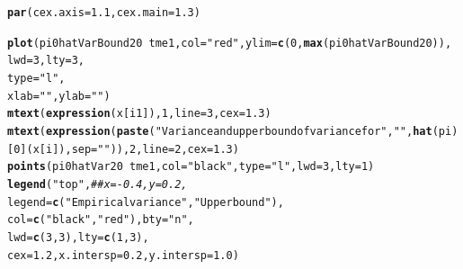 \documentclass{article}\usepackage[]{graphicx}\usepackage[]{color}
\makeatletter
\newcommand{\hlnum}[1]{\textcolor[rgb]{0.686,0.059,0.569}{#1}}%
\newcommand{\hlstr}[1]{\textcolor[rgb]{0.192,0.494,0.8}{#1}}%
\newcommand{\hlcom}[1]{\textcolor[rgb]{0.678,0.584,0.686}{\textit{#1}}}%
\newcommand{\hlopt}[1]{\textcolor[rgb]{0,0,0}{#1}}%
\newcommand{\hlstd}[1]{\textcolor[rgb]{0.345,0.345,0.345}{#1}}%
\newcommand{\hlkwc}[1]{\textcolor[rgb]{0.333,0.667,0.333}{#1}}%
\newcommand{\hlkwd}[1]{\textcolor[rgb]{0.737,0.353,0.396}{\textbf{#1}}}%
\newenvironment{kframe}{%
 \def\at@end@of@kframe{}%
 \ifinner\ifhmode%
  \def\at@end@of@kframe{\end{minipage}}%
  \begin{minipage}{\columnwidth}%
 \fi\fi%
 \def\FrameCommand##1{\hskip\@totalleftmargin \hskip-\fboxsep
 \colorbox{shadecolor}{##1}\hskip-\fboxsep
     \hskip-\linewidth \hskip-\@totalleftmargin \hskip\columnwidth}%
 \MakeFramed {\advance\hsize-\width
   \@totalleftmargin\z@ \linewidth\hsize
   \@setminipage}}%
 {\par\unskip\endMakeFramed%
 \at@end@of@kframe}
\newenvironment{knitrout}{}{} %
\makeatother
\begin{document}
\begin{knitrout}
\color{fgcolor}\begin{kframe}
\begin{alltt}
\hlkwd{par}\hlstd{(}\hlkwc{cex.axis} \hlstd{=} \hlnum{1.1}\hlstd{,} \hlkwc{cex.main}\hlstd{=}\hlnum{1.3}\hlstd{)}

\hlkwd{plot}\hlstd{(pi0hatVarBound20} \hlopt{~} \hlstd{tme1,} \hlkwc{col}\hlstd{=}\hlstr{"red"}\hlstd{,} \hlkwc{ylim}\hlstd{=}\hlkwd{c}\hlstd{(}\hlnum{0}\hlstd{,} \hlkwd{max}\hlstd{(pi0hatVarBound20)),}
     \hlkwc{lwd}\hlstd{=}\hlnum{3}\hlstd{,} \hlkwc{lty}\hlstd{=}\hlnum{3}\hlstd{,}
     \hlkwc{type}\hlstd{=}\hlstr{"l"}\hlstd{,}
     \hlkwc{xlab}\hlstd{=}\hlstr{""}\hlstd{,} \hlkwc{ylab}\hlstd{=}\hlstr{""}\hlstd{)}
\hlkwd{mtext}\hlstd{(}\hlkwd{expression}\hlstd{(x[i1]),} \hlnum{1}\hlstd{,} \hlkwc{line}\hlstd{=}\hlnum{3}\hlstd{,} \hlkwc{cex}\hlstd{=}\hlnum{1.3}\hlstd{)}
\hlkwd{mtext}\hlstd{(}\hlkwd{expression}\hlstd{(}\hlkwd{paste}\hlstd{(}\hlstr{"Variance and upper bound of variance for "}\hlstd{,} \hlstr{" "}\hlstd{,} \hlkwd{hat}\hlstd{(pi)[}\hlnum{0}\hlstd{](x[i]),} \hlkwc{sep}\hlstd{=}\hlstr{" "}\hlstd{)),} \hlnum{2}\hlstd{,} \hlkwc{line}\hlstd{=}\hlnum{2}\hlstd{,} \hlkwc{cex}\hlstd{=}\hlnum{1.3}\hlstd{)}
\hlkwd{points}\hlstd{(pi0hatVar20} \hlopt{~} \hlstd{tme1,} \hlkwc{col}\hlstd{=}\hlstr{"black"}\hlstd{,} \hlkwc{type}\hlstd{=}\hlstr{"l"}\hlstd{,} \hlkwc{lwd}\hlstd{=}\hlnum{3}\hlstd{,} \hlkwc{lty}\hlstd{=}\hlnum{1}\hlstd{)}
\hlkwd{legend}\hlstd{(}\hlstr{"top"}\hlstd{,} \hlcom{##x=-0.4, y=0.2, }
       \hlkwc{legend}\hlstd{=}\hlkwd{c}\hlstd{(}\hlstr{"Empirical variance"}\hlstd{,} \hlstr{"Upper bound"}\hlstd{),}
       \hlkwc{col}\hlstd{=}\hlkwd{c}\hlstd{(}\hlstr{"black"}\hlstd{,} \hlstr{"red"}\hlstd{),} \hlkwc{bty}\hlstd{=}\hlstr{"n"}\hlstd{,}
       \hlkwc{lwd}\hlstd{=}\hlkwd{c}\hlstd{(}\hlnum{3}\hlstd{,}\hlnum{3}\hlstd{),} \hlkwc{lty}\hlstd{=}\hlkwd{c}\hlstd{(}\hlnum{1}\hlstd{,}\hlnum{3}\hlstd{),}
       \hlkwc{cex}\hlstd{=}\hlnum{1.2}\hlstd{,} \hlkwc{x.intersp}\hlstd{=}\hlnum{0.2}\hlstd{,} \hlkwc{y.intersp}\hlstd{=}\hlnum{1.0}\hlstd{)}
\end{alltt}
\end{kframe}


\end{knitrout}
\end{document}
